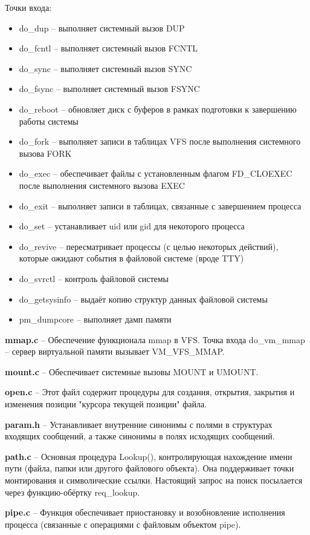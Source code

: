 Точки входа:
\begin{itemize}
\item do\_dup -- выполняет системный вызов DUP
\item do\_fcntl -- выполняет системный вызов FCNTL
\item do\_sync -- выполняет системный вызов SYNC
\item do\_fsync --  выполняет системный вызов FSYNC
\item do\_reboot -- обновляет диск с буферов в рамках подготовки к завершению работы системы
\item do\_fork -- выполняет записи в таблицах VFS после выполнения системного вызова FORK
\item do\_exec -- обеспечивает файлы с установленным флагом FD\_CLOEXEC после выполнения системного вызова EXEC
\item do\_exit -- выполняет записи в таблицах, связанные с завершением процесса
\item do\_set -- устанавливает uid или gid для некоторого процесса
\item do\_revive -- пересматривает процессы (с целью некоторых действий), которые ожидают события в файловой системе (вроде TTY)
\item do\_svrctl -- контроль файловой системы
\item do\_getsysinfo -- выдаёт копию структур данных файловой системы
\item pm\_dumpcore -- выполняет дамп памяти
\end{itemize}

\textbf{mmap.c} -- Обеспечение функционала mmap в VFS. Точка входа do\_vm\_mmap -- сервер виртуальной памяти вызывает VM\_VFS\_MMAP.

\textbf{mount.c} -- Обеспечивает системные вызовы MOUNT и UMOUNT.

\textbf{open.c} -- Этот файл содержит процедуры для создания, открытия, закрытия и изменения позиции "курсора текущей позиции" файла.

\textbf{param.h} -- Устанавливает внутренние синонимы с полями в структурах входящих сообщений, а также синонимы в полях исходящих сообщений.

\textbf{path.c} -- Основная процедура Lookup(), контролирующая нахождение имени пути (файла, папки или другого файлового объекта). Она поддерживает точки монтирования и символические ссылки. Настоящий запрос на поиск посылается через функцию-обёртку req\_lookup.

\textbf{pipe.c} -- Функция обеспечивает приостановку и возобновление исполнения процесса (связанные с операциями с файловым объектом pipe).

